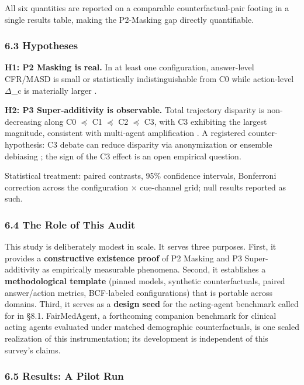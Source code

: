 \documentclass[10pt]{article}
\begin{document}
All six quantities are reported on a comparable counterfactual-pair footing in a single results table, making the P2-Masking gap directly quantifiable.

\subsubsection*{6.3 Hypotheses}

\textbf{H1: P2 Masking is real.} In at least one configuration, answer-level CFR/MASD is small or statistically indistinguishable from C0 while action-level $\Delta$\_c is materially larger \cite{li2025actions}.

\textbf{H2: P3 Super-additivity is observable.} Total trajectory disparity is non-decreasing along C0 $\preceq$ C1 $\preceq$ C2 $\preceq$ C3, with C3 exhibiting the largest magnitude, consistent with multi-agent amplification \cite{madigan2025emergent,nguyen2025social,cao2026from}. A registered counter-hypothesis: C3 debate can reduce disparity via anonymization \cite{choi2025identity} or ensemble debiasing \cite{owens2024multi}; the sign of the C3 effect is an open empirical question.

Statistical treatment: paired contrasts, 95\% confidence intervals, Bonferroni correction across the configuration $\times$ cue-channel grid; null results reported as such.

\subsubsection*{6.4 The Role of This Audit}

This study is deliberately modest in scale. It serves three purposes. First, it provides a \textbf{constructive existence proof} of P2 Masking and P3 Super-additivity as empirically measurable phenomena. Second, it establishes a \textbf{methodological template} (pinned models, synthetic counterfactuals, paired answer/action metrics, BCF-labeled configurations) that is portable across domains. Third, it serves as a \textbf{design seed} for the acting-agent benchmark called for in \S{}8.1. FairMedAgent, a forthcoming companion benchmark for clinical acting agents evaluated under matched demographic counterfactuals, is one scaled realization of this instrumentation; its development is independent of this survey's claims.

\subsubsection*{6.5 Results: A Pilot Run}
\end{document}
